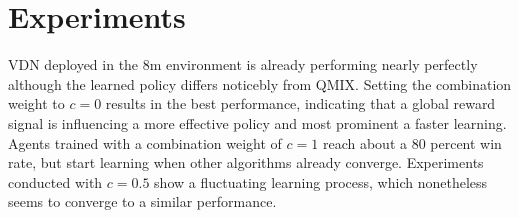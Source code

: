 \section{Experiments}


VDN deployed in the 8m environment is already performing nearly perfectly although the learned policy differs noticebly from QMIX. Setting the combination weight to $c=0$ results in the best performance, indicating that a global reward signal is influencing a more effective policy and most prominent a faster learning. Agents trained with a combination weight of $c=1$ reach about a 80 percent win rate, but start learning when other algorithms already converge. Experiments conducted with $c=0.5$ show a fluctuating learning process, which nonetheless seems to converge to a similar performance. 


